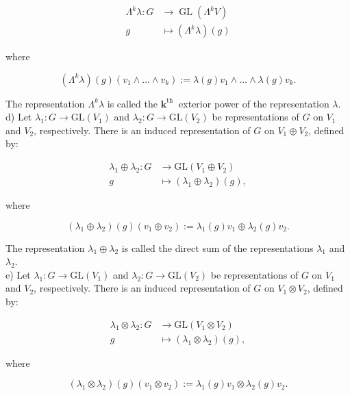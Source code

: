 \documentclass[10pt, letterpaper]{article}
\begin{document}
$$
\begin{aligned}
\Lambda^{k} \lambda: G & \rightarrow \operatorname{GL}\left(\Lambda^{k} V\right) \\
g & \mapsto\left(\Lambda^{k} \lambda\right)(g)
\end{aligned}
$$

where

$$
\left(\Lambda^{k} \lambda\right)(g)\left(v_{1} \wedge \ldots \wedge v_{k}\right):=\lambda(g) v_{1} \wedge \ldots \wedge \lambda(g) v_{k} .
$$

The representation $\Lambda^{k} \lambda$ is called the $\mathbf{k}^{\text {th }}$ exterior power of the representation $\lambda$.\\
d) Let $\lambda_{1}: G \rightarrow \mathrm{GL}\left(V_{1}\right)$ and $\lambda_{2}: G \rightarrow \mathrm{GL}\left(V_{2}\right)$ be representations of $G$ on $V_{1}$ and $V_{2}$, respectively. There is an induced representation of $G$ on $V_{1} \oplus V_{2}$, defined by:

$$
\begin{aligned}
\lambda_{1} \oplus \lambda_{2}: G & \rightarrow \mathrm{GL}\left(V_{1} \oplus V_{2}\right) \\
g & \mapsto\left(\lambda_{1} \oplus \lambda_{2}\right)(g),
\end{aligned}
$$

where

$$
\left(\lambda_{1} \oplus \lambda_{2}\right)(g)\left(v_{1} \oplus v_{2}\right):=\lambda_{1}(g) v_{1} \oplus \lambda_{2}(g) v_{2} .
$$

The representation $\lambda_{1} \oplus \lambda_{2}$ is called the direct sum of the representations $\lambda_{1}$ and $\lambda_{2}$.\\
e) Let $\lambda_{1}: G \rightarrow \mathrm{GL}\left(V_{1}\right)$ and $\lambda_{2}: G \rightarrow \mathrm{GL}\left(V_{2}\right)$ be representations of $G$ on $V_{1}$ and $V_{2}$, respectively. There is an induced representation of $G$ on $V_{1} \otimes V_{2}$, defined by:

$$
\begin{aligned}
\lambda_{1} \otimes \lambda_{2}: G & \rightarrow \mathrm{GL}\left(V_{1} \otimes V_{2}\right) \\
g & \mapsto\left(\lambda_{1} \otimes \lambda_{2}\right)(g),
\end{aligned}
$$

where

$$
\left(\lambda_{1} \otimes \lambda_{2}\right)(g)\left(v_{1} \otimes v_{2}\right):=\lambda_{1}(g) v_{1} \otimes \lambda_{2}(g) v_{2} .
$$
\end{document}
